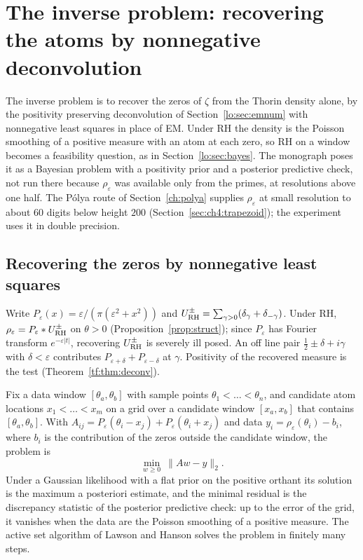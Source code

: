 \section{The inverse problem: recovering the atoms by nonnegative deconvolution}\label{ch:deconv}

The inverse problem is to recover the zeros of $\zeta$ from the Thorin density alone, by the positivity preserving deconvolution of Section~\ref{lo:sec:emnum} with nonnegative least squares in place of EM. Under RH the density is the Poisson smoothing of a positive measure with an atom at each zero, so RH on a window becomes a feasibility question, as in Section~\ref{lo:sec:bayes}. The monograph \cite[Section 19.3]{P26} poses it as a Bayesian problem with a positivity prior and a posterior predictive check, not run there because $\rho_\varepsilon$ was available only from the primes, at resolutions above one half. The P\'olya route of Section~\ref{ch:polya} supplies $\rho_\varepsilon$ at small resolution to about $60$ digits below height $200$ (Section~\ref{sec:ch4:trapezoid}); the experiment uses it in double precision.

\subsection{Recovering the zeros by nonnegative least squares}\label{sec:ch17:nnls}

Write $P_\varepsilon(x)=\varepsilon/(\pi(\varepsilon^2+x^2))$ and $U^\pm_{\mathrm{RH}}=\sum_{\gamma>0}(\delta_\gamma+\delta_{-\gamma})$. Under RH, $\rho_\varepsilon=P_\varepsilon*U^\pm_{\mathrm{RH}}$ on $\theta>0$ (Proposition~\ref{prop:struct}); since $P_\varepsilon$ has Fourier transform $e^{-\varepsilon|t|}$, recovering $U^\pm_{\mathrm{RH}}$ is severely ill posed. An off line pair $\frac12\pm\delta+i\gamma$ with $\delta<\varepsilon$ contributes $P_{\varepsilon+\delta}+P_{\varepsilon-\delta}$ at $\gamma$. Positivity of the recovered measure is the test (Theorem~\ref{tf:thm:deconv}).

Fix a data window $[\theta_a,\theta_b]$ with sample points $\theta_1<\dots<\theta_n$, and candidate atom locations $x_1<\dots<x_m$ on a grid over a candidate window $[x_a,x_b]$ that contains $[\theta_a,\theta_b]$. With $A_{ij}=P_\varepsilon(\theta_i-x_j)+P_\varepsilon(\theta_i+x_j)$ and data $y_i=\rho_\varepsilon(\theta_i)-b_i$, where $b_i$ is the contribution of the zeros outside the candidate window, the problem is
\[
\min_{w\ge0}\ \|Aw-y\|_2 .
\]
Under a Gaussian likelihood with a flat prior on the positive orthant its solution is the maximum a posteriori estimate, and the minimal residual is the discrepancy statistic of the posterior predictive check: up to the error of the grid, it vanishes when the data are the Poisson smoothing of a positive measure. The active set algorithm of Lawson and Hanson \cite{LawsonHanson74} solves the problem in finitely many steps.

